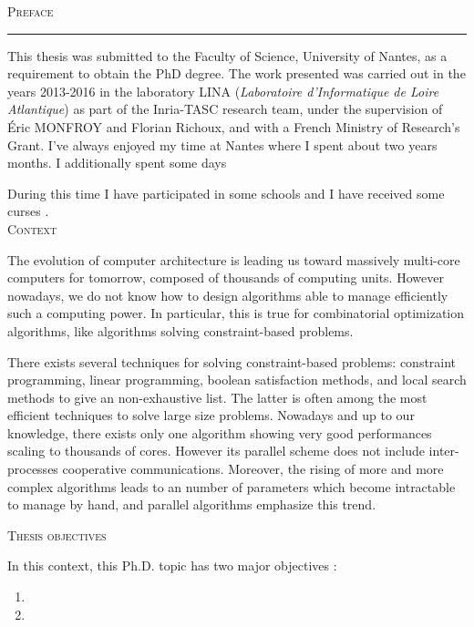\thispagestyle{empty}
\hfill
\vspace*{3cm}
\noindent\Huge\textsc{Preface}\\
\normalsize
\noindent\rule[2pt]{\textwidth}{0.8pt}
\hspace*{3cm}

 This thesis was submitted to the Faculty of Science, University of Nantes, as a requirement to obtain the PhD degree. The work presented was carried out in the years 2013-2016 in the laboratory LINA ({\it Laboratoire d'Informatique de Loire Atlantique}) as part of the Inria-TASC research team, under the supervision of \'Eric {\sc MONFROY} and Florian {\sc Richoux}, and with a French Ministry of Research's Grant. I've always enjoyed my time at Nantes where I spent about two years months. I additionally spent some days 
 
 During this time I have participated in some schools  and I have received some curses .\\
 
 \Large\textsc{Context}\normalsize
 
 The evolution of computer architecture is leading us toward massively multi-core computers for tomorrow, composed of thousands of computing units. However nowadays, we do not know how to design algorithms able to manage efficiently such a computing power. In particular, this is true for combinatorial optimization algorithms, like algorithms solving constraint-based problems.
 
 There exists several techniques for solving constraint-based problems: constraint programming, linear programming, boolean satisfaction methods, and local search methods to give an non-exhaustive list. The latter is often among the most efficient techniques to solve large size problems. Nowadays and up to our knowledge, there exists only one algorithm showing very good performances scaling to thousands of cores. However its parallel scheme does not include inter-processes cooperative communications. Moreover, the rising of more and more complex algorithms leads to an number of parameters which become intractable to manage by hand, and parallel algorithms emphasize this trend.
 
 \Large\textsc{Thesis objectives}\normalsize
 
 In this context, this Ph.D. topic has two major objectives : 
 \begin{enumerate}
 	\item {}
 	
 	\item {}
 \end{enumerate}
 
